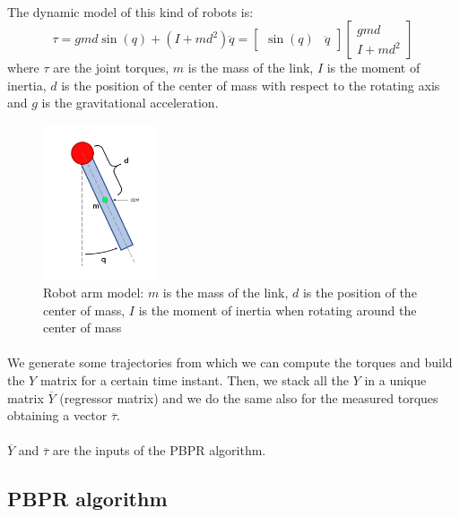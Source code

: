 \documentclass{article}
\begin{document}
\paragraph{} 
The dynamic model of this kind of robots is:
\[\tau=gmd \sin(q) + (I+md^2)\ddot{q}= \begin{bmatrix}
\sin(q) & \ddot{q}
\end{bmatrix}\begin{bmatrix}
gmd \\ I +md^2
\end{bmatrix}\]
where $\tau$ are the joint torques, $m$ is the mass of the link, $I$ is the moment of inertia, $d$ is the position of the center of mass with respect to the rotating axis and $g$ is the gravitational acceleration.

\begin{figure}[!htbp]
\centering
\includegraphics[width=0.3\textwidth]{images/1-dof/model.jpeg}
\caption{Robot arm model: $m$ is the mass of the link, $d$ is the position of the center of mass, $I$ is the moment of inertia when rotating around the center of mass}
\end{figure}
\FloatBarrier

\paragraph{} We generate some trajectories from which we can compute the torques and build the $Y$ matrix for a certain time instant. Then, we stack all the $Y$ in a unique matrix $\overline{Y}$ (regressor matrix) and we do the same also for the measured torques obtaining a vector $\overline{\tau}$. \\\\
$\overline{Y}$ and $\overline{\tau}$ are the inputs of the PBPR algorithm.

\subsection{PBPR algorithm}
\end{document}

